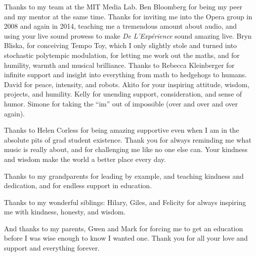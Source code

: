 \begin{fullwidth}
\vspace{5mm}
\noindent Thanks to my team at the MIT Media Lab. Ben Bloomberg for
being my peer and my mentor at the same time. Thanks for inviting me
into the Opera group in 2008 and again in 2014, teaching me a
tremendous amount about audio, and using your live sound prowess to
make \textit{De L'Exp\'{e}rience} sound amazing live. Bryn Bliska, for
conceiving Tempo Toy, which I only slightly stole and turned into
stochastic polytempic modulation, for letting me work out the maths,
and for humility, warmth and musical brilliance. Thanks to Rebecca
Kleinberger for infinite support and insight into everything from math
to hedgehogs to humans. David for peace, intensity, and robots. Akito
for your inspiring attitude, wisdom, projects, and humility. Kelly for
unending support, consideration, and sense of humor. Simone
for taking the ``im'' out of impossible (over and over and over
again).

\vspace{5mm}
\noindent Thanks to Helen Corless for being amazing supportive even
when I am in the absolute pits of grad student existence. Thank you
for always reminding me what music is really about, and for
challenging me like no one else can. Your kindness and wisdom make
the world a better place every day.

\vspace{5mm}
\noindent Thanks to my grandparents for leading by example, and teaching
kindness and dedication, and for endless support in education.

\vspace{5mm}
\noindent Thanks to my wonderful siblings: Hilary, Giles, and Felicity
for always inspiring me with kindness, honesty, and wisdom.

\vspace{5mm}
\noindent And thanks to my parents, Gwen and Mark for forcing me to get an
education before I was wise enough to know I wanted one. Thank you for
all your love and support and everything forever.
\end{fullwidth}

